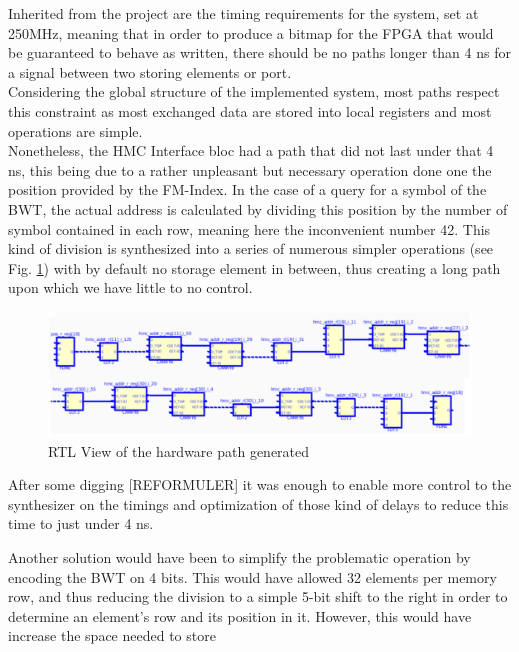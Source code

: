 Inherited from the project are the timing requirements for the system, set at 250MHz, meaning that in order to produce a bitmap for the FPGA that would be guaranteed to behave as written, there should be no paths longer than 4 ns for a signal between two storing elements or port. \\
Considering the global structure of the implemented system, most paths respect this constraint as most exchanged data are stored into local registers and most operations are simple.\\

Nonetheless, the HMC Interface bloc had a path that did not last under that 4 ns, this being due to a rather unpleasant but necessary operation done one the position provided by the FM-Index. In the case of a query for a symbol of the BWT, the actual address is calculated by dividing this position by the number of symbol contained in each row, meaning here the inconvenient number 42. This kind of division is synthesized into a series of numerous simpler operations (see Fig. \ref{fig:timing}) with by default no storage element in between, thus creating a long path upon which we have little to no control. \\

\begin{figure}[H]
    \centering
    \hspace*{-3mm}\includegraphics[scale = 0.4]{Figures/TIMING_RTL.png}
    \caption{RTL View of the hardware path generated}
    \label{fig:timing}
\end{figure}

After some digging [REFORMULER] it was enough to enable more control to the synthesizer on the timings and optimization of those kind of delays to reduce this time to just under 4 ns. 

Another solution would have been to simplify the problematic operation by encoding the BWT on 4 bits. This would have allowed 32 elements per memory row, and thus reducing the division to a simple 5-bit shift to the right in order to determine an element's row and its position in it. However, this would have increase the space needed to store 

